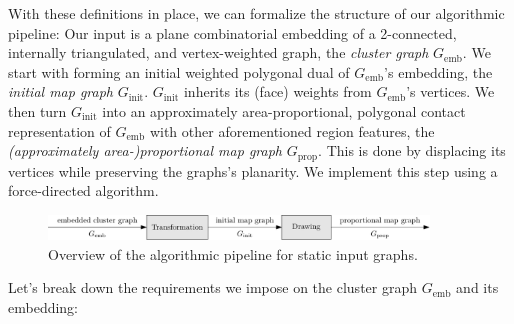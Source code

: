 
With these definitions in place, we can formalize the structure of our algorithmic pipeline: Our input is a plane combinatorial embedding of a 2-connected, internally triangulated, and vertex-weighted graph, the \emph{cluster graph} $G_\text{emb}$. We start with forming an initial weighted polygonal dual of $G_\text{emb}$'s embedding, the \emph{initial map graph} $G_\text{init}$. $G_\text{init}$ inherits its (face) weights from $G_\text{emb}$'s vertices. We then turn $G_\text{init}$ into an approximately area-proportional, polygonal contact representation of $G_\text{emb}$ with other aforementioned region features, the \emph{(approximately area-)proportional map graph} $G_\text{prop}$. This is done by displacing its vertices while preserving the graphs's planarity. We implement this step using a force-directed algorithm.

\begin{figure}[H]
	\centering\includegraphics[width=0.9\textwidth]{Resources/Pipeline-Thesis-Static.pdf}
	\caption{Overview of the algorithmic pipeline for static input graphs.}
	\label{fig:static-pipeline-thesis}
\end{figure}

Let's break down the requirements we impose on the cluster graph $G_\text{emb}$ and its embedding:

